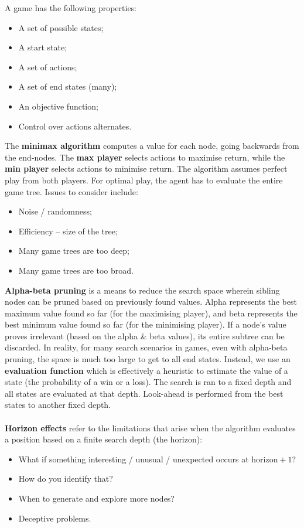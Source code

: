 \documentclass[a4paper,11pt]{article}
\begin{document}
A game has the following properties:
\begin{itemize}
    \item   A set of possible states;
    \item   A start state;
    \item   A set of actions;
    \item   A set of end states (many);
    \item   An objective function;
    \item   Control over actions alternates.
\end{itemize}

The \textbf{minimax algorithm} computes a value for each node, going backwards from the end-nodes.
The \textbf{max player} selects actions to maximise return, while the \textbf{min player} selects actions to minimise return.
The algorithm assumes perfect play from both players.
For optimal play, the agent has to evaluate the entire game tree.
Issues to consider include:
\begin{itemize}
    \item   Noise / randomness;
    \item   Efficiency -- size of the tree;
    \item   Many game trees are too deep;
    \item   Many game trees are too broad.
\end{itemize}

\textbf{Alpha-beta pruning} is a means to reduce the search space wherein sibling nodes can be pruned based on previously found values.
Alpha represents the best maximum value found so far (for the maximising player), and beta represents the best minimum value found so far (for the minimising player).
If a node's value proves irrelevant (based on the alpha \& beta values), its entire subtree can be discarded.
In reality, for many search scenarios in games, even with alpha-beta pruning, the space is much too large to get to all end states.
Instead, we use an \textbf{evaluation function} which is effectively a heuristic to estimate the value of a state (the probability of a win or a loss).
The search is ran to a fixed depth and all states are evaluated at that depth.
Look-ahead is performed from the best states to another fixed depth.
\\\\
\textbf{Horizon effects} refer to the limitations that arise when the algorithm evaluates a position based on a finite search depth (the horizon):
\begin{itemize}
    \item   What if something interesting / unusual / unexpected occurs at $\text{horizon}+1$?
    \item   How do you identify that?
    \item   When to generate and explore more nodes?
    \item   Deceptive problems.
\end{itemize}
\end{document}
